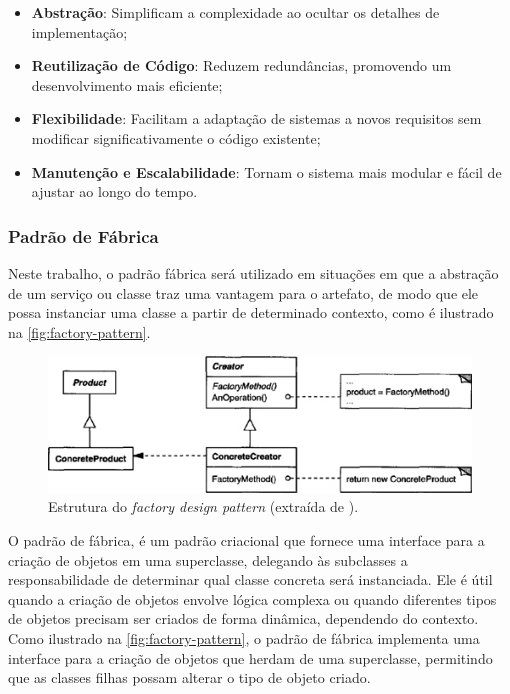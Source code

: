 \documentclass[a4paper, 12pt]{article}
\newcommand{\citeb}[1]{\bibleftbracket\cite{#1}\bibrightbracket}
\begin{document}
    \begin{itemize}
        \item \textbf{Abstração}: Simplificam a complexidade ao ocultar os detalhes de implementação;
        \item \textbf{Reutilização de Código}: Reduzem redundâncias, promovendo um desenvolvimento mais eficiente;
        \item \textbf{Flexibilidade}: Facilitam a adaptação de sistemas a novos requisitos sem modificar significativamente o código existente;
        \item \textbf{Manutenção e Escalabilidade}: Tornam o sistema mais modular e fácil de ajustar ao longo do tempo.
    \end{itemize}
    
    \subsubsection{Padrão de Fábrica} \label{sec:factory_pattern}

    Neste trabalho, o padrão fábrica será utilizado em situações em que a abstração de um serviço ou classe traz uma vantagem para o artefato, de modo que ele possa instanciar uma classe a partir de determinado contexto, como é ilustrado na \autoref{fig:factory-pattern}.
    
    \begin{figure}[ht]
        \includegraphics[width=\textwidth,height=0.9\textheight,keepaspectratio]{images/factory-design-pattern.jpg}
        \centering
        \caption{Estrutura do \textit{factory design pattern} (extraída de \citeb{design_patterns}).}
        \centering
        \label{fig:factory-pattern}
    \end{figure}
    
    O padrão de fábrica, é um padrão criacional que fornece uma interface para a criação de objetos em uma superclasse, delegando às subclasses a responsabilidade de determinar qual classe concreta será instanciada. Ele é útil quando a criação de objetos envolve lógica complexa ou quando diferentes tipos de objetos precisam ser criados de forma dinâmica, dependendo do contexto. Como ilustrado na \autoref{fig:factory-pattern}, o padrão de fábrica implementa uma interface para a criação de objetos que herdam de uma superclasse, permitindo que as classes filhas possam alterar o tipo de objeto criado. 
\end{document}
